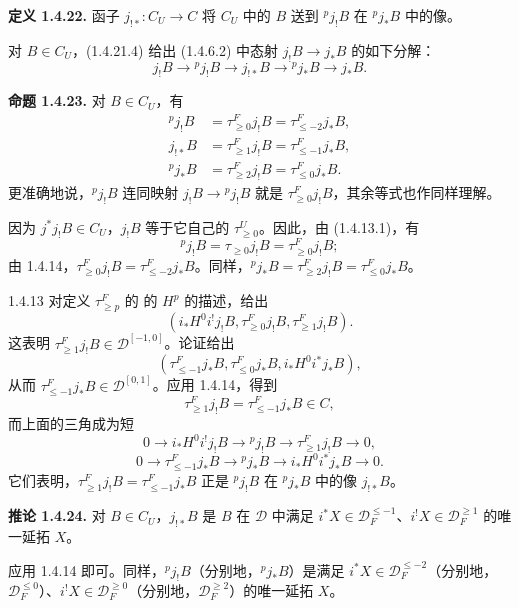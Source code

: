 \par\medskip\noindent\textbf{定义 1.4.22.}
函子 $j_{!*}:C_U\to C$ 将 $C_U$ 中的 $B$ 送到 ${}^pj_!B$ 在 ${}^pj_*B$ 中的像。

对 $B\in C_U$，(1.4.21.4) 给出 (1.4.6.2) 中态射 $j_!B\to j_*B$ 的如下分解：
\begin{equation*}
j_!B\longrightarrow{}^pj_!B\longrightarrow j_{!*}B
 \longrightarrow{}^pj_*B\longrightarrow j_*B.\tag{1.4.22.1}
\end{equation*}

\par\medskip\noindent\textbf{命题 1.4.23.}
对 $B\in C_U$，有
\[
\begin{aligned}
{}^pj_!B&=\tau^F_{\ge0}j_!B=\tau^F_{\le-2}j_*B,\\
j_{!*}B&=\tau^F_{\ge1}j_!B=\tau^F_{\le-1}j_*B,\\
{}^pj_*B&=\tau^F_{\ge2}j_!B=\tau^F_{\le0}j_*B.
\end{aligned}
\]
更准确地说，${}^pj_!B$ 连同映射 $j_!B\to{}^pj_!B$ 就是 $\tau^F_{\ge0}j_!B$，其余等式也作同样理解。

因为 $j^*j_!B\in C_U$，$j_!B$ 等于它自己的 $\tau^U_{\ge0}$。因此，由 (1.4.13.1)，有
\[
{}^pj_!B=\tau_{\ge0}j_!B=\tau^F_{\ge0}j_!B;
\]
由 1.4.14，$\tau^F_{\ge0}j_!B=\tau^F_{\le-2}j_*B$。同样，${}^pj_*B=\tau^F_{\ge2}j_!B=\tau^F_{\le0}j_*B$。

1.4.13 对定义 $\tau^F_{\ge p}$ 的 的 $H^p$ 的描述，给出
\[
(i_*H^0i^!j_!B,\tau^F_{\ge0}j_!B,\tau^F_{\ge1}j_!B).
\]
这表明 $\tau^F_{\ge1}j_!B\in\mathcal D^{[-1,0]}$。论证给出
\[
(\tau^F_{\le-1}j_*B,\tau^F_{\le0}j_*B,i_*H^0i^*j_*B),
\]
从而 $\tau^F_{\le-1}j_*B\in\mathcal D^{[0,1]}$。应用 1.4.14，得到
\[
\tau^F_{\ge1}j_!B=\tau^F_{\le-1}j_*B\in C,
\]
而上面的三角成为短
\[
0\longrightarrow i_*H^0i^!j_!B\longrightarrow{}^pj_!B
 \longrightarrow\tau^F_{\ge1}j_!B\longrightarrow0,
\]
\[
0\longrightarrow\tau^F_{\le-1}j_*B\longrightarrow{}^pj_*B
 \longrightarrow i_*H^0i^*j_*B\longrightarrow0.
\]
它们表明，$\tau^F_{\ge1}j_!B=\tau^F_{\le-1}j_*B$ 正是 ${}^pj_!B$ 在 ${}^pj_*B$ 中的像 $j_{!*}B$。

\par\medskip\noindent\textbf{推论 1.4.24.}
对 $B\in C_U$，$j_{!*}B$ 是 $B$ 在 $\mathcal D$ 中满足 $i^*X\in\mathcal D_F^{\le-1}$、$i^!X\in\mathcal D_F^{\ge1}$ 的唯一延拓 $X$。

应用 1.4.14 即可。同样，${}^pj_!B$（分别地，${}^pj_*B$）是满足 $i^*X\in\mathcal D_F^{\le-2}$（分别地，$\mathcal D_F^{\le0}$）、$i^!X\in\mathcal D_F^{\ge0}$（分别地，$\mathcal D_F^{\ge2}$）的唯一延拓 $X$。

